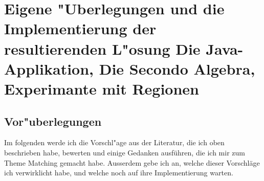 \chapter[Eigene "Uberlegungen und die Implementierung \anmerkung{30 Seiten }]{Eigene "Uberlegungen und die Implementierung der resultierenden L"osung
\normalsize{Die Java-Applikation, Die Secondo Algebra, Experimante mit Regionen }
}
\minitoc
\newpage
\section{Vor"uberlegungen }
Im folgenden werde ich die Vorschl"age aus der Literatur, die ich oben beschrieben habe, bewerten und einige Gedanken ausführen, die ich mir zum Theme Matching gemacht habe. Ausserdem gebe ich an, welche dieser Vorschläge ich verwirklicht habe, und welche noch auf ihre Implementierung warten.

